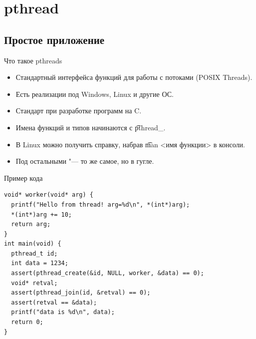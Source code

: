 \section{pthread}
\subsection{Простое приложение}

\begin{frame}
\end{frame}

\begin{frame}{Что такое pthreads}
	\begin{itemize}
		\item Стандартный интерфейса функций для работы с потоками (POSIX Threads).
		\item Есть реализации под Windows, Linux и другие ОС.
		\item Стандарт при разработке программ на C.
		\item Имена функций и типов начинаются с \t{pthread\_}.
		\item В Linux можно получить справку, набрав \t{man <имя функции>} в консоли.
		\item Под остальными "--- то же самое, но в гугле.
	\end{itemize}
\end{frame}

\begin{frame}[fragile]{Пример кода}
\begin{verbatim}
void* worker(void* arg) {
  printf("Hello from thread! arg=%d\n", *(int*)arg);
  *(int*)arg += 10;
  return arg;
}
int main(void) {
  pthread_t id;
  int data = 1234;
  assert(pthread_create(&id, NULL, worker, &data) == 0);
  void* retval;
  assert(pthread_join(id, &retval) == 0);
  assert(retval == &data);
  printf("data is %d\n", data);
  return 0;
}
\end{verbatim}
\end{frame}


